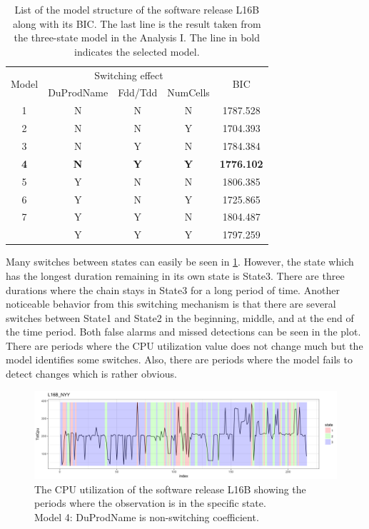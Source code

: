 \begin{table}[h]
\caption{List of the model structure of the software release L16B along with
its BIC. The last line is the result taken from the three-state model
in the Analysis I. The line in bold indicates the selected model.}
\label{L16B_switch}
\centering{}%
\begin{tabular}{ccccc}
\toprule 
\multirow{2}{*}{Model} & \multicolumn{3}{c}{Switching effect} & \multirow{2}{*}{BIC}\tabularnewline
\cmidrule{2-4} 
 & DuProdName & Fdd/Tdd & NumCells & \tabularnewline
\midrule
\midrule 
1 & N & N & N & 1787.528\tabularnewline
2 & N & N & Y & 1704.393\tabularnewline
3 & N & Y & N & 1784.384\tabularnewline
\textbf{4} & \textbf{N} & \textbf{Y} & \textbf{Y} & \textbf{1776.102}\tabularnewline
5 & Y & N & N & 1806.385\tabularnewline
6 & Y & N & Y & 1725.865\tabularnewline
7 & Y & Y & N & 1804.487\tabularnewline
\midrule
 & Y & Y & Y & 1797.259\tabularnewline
\bottomrule
\end{tabular}
\end{table}

Many switches between states can easily be seen in \ref{L16B_NYY}.
However, the state which has the longest duration remaining in its
own state is State3. There are three durations where the chain stays
in State3 for a long period of time. Another noticeable behavior from
this switching mechanism is that there are several switches between
State1 and State2 in the beginning, middle, and at the end of the
time period. Both false alarms and missed detections can be seen in
the plot. There are periods where the CPU utilization value does not
change much but the model identifies some switches. Also, there are
periods where the model fails to detect changes which is rather obvious.

\begin{figure}[H]
\begin{centering}
\includegraphics[scale=0.35]{picture/L16B_NYY1}
\par\end{centering}
\caption{The CPU utilization of the software release L16B showing the periods
where the observation is in the specific state. \protect \\
Model 4: DuProdName is non-switching coefficient.}
\label{L16B_NYY}
\end{figure}


